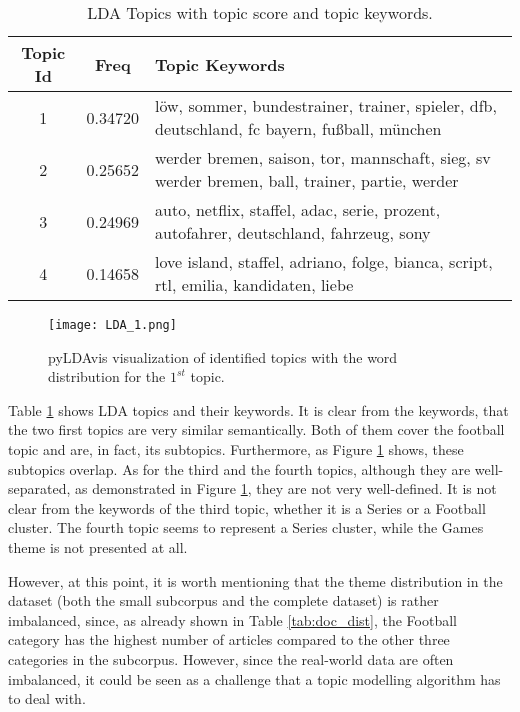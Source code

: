 \documentclass[fontsize=12pt,a4paper,twoside,openany]{scrbook}
\begin{document}
\renewcommand{\arraystretch}{2}
\begin{table}[ht]
    \centering
    \begin{tabularx}{\textwidth}{ |c|c|X| } 
        \hline
        \textbf{Topic Id} & \textbf{Freq} & \textbf{Topic Keywords} \\
        \hline
        1 & 0.34720 &  löw, sommer, bundestrainer, trainer, spieler, dfb, deutschland, fc bayern, fußball, münchen \\
        \hline
        2 & 0.25652 & werder bremen, saison, tor, mannschaft, sieg, sv werder bremen, ball, trainer, partie, werder \\
        \hline
        3 & 0.24969 & auto, netflix, staffel, adac, serie, prozent, autofahrer, deutschland, fahrzeug, sony \\
        \hline
        4 & 0.14658 &  love island, staffel, adriano, folge, bianca, script, rtl, emilia, kandidaten, liebe \\
        \hline
    \end{tabularx}
    \caption{LDA Topics with topic score and topic keywords.}
    \label{tab:lda_topic_keywords}
\end{table}
\renewcommand{\arraystretch}{1}

\begin{figure}[h]
\centering
\texttt{[image: LDA\_1.png]}
\caption{pyLDAvis visualization of identified topics with the word distribution for the \(1^{st}\) topic.}
\label{fig:lda_topics}
\end{figure}


Table \ref{tab:lda_topic_keywords} shows LDA topics and their keywords. It is clear from the keywords, that the two first topics are very similar semantically. Both of them cover the football topic and are, in fact, its subtopics. Furthermore, as Figure \ref{fig:lda_topics} shows, these subtopics overlap. As for the third and the fourth topics, although they are well-separated, as demonstrated in Figure \ref{fig:lda_topics}, they are not very well-defined. It is not clear from the keywords of the third topic, whether it is a Series or a Football cluster. The fourth topic seems to represent a Series cluster, while the Games theme is not presented at all.

However, at this point, it is worth mentioning that the theme distribution in the dataset (both the small subcorpus and the complete dataset) is rather imbalanced, since, as already shown in Table \ref{tab:doc_dist}, the Football category has the highest number of articles compared to the other three categories in the subcorpus. However, since the real-world data are often imbalanced, it could be seen as a challenge that a topic modelling algorithm has to deal with.
\end{document}
